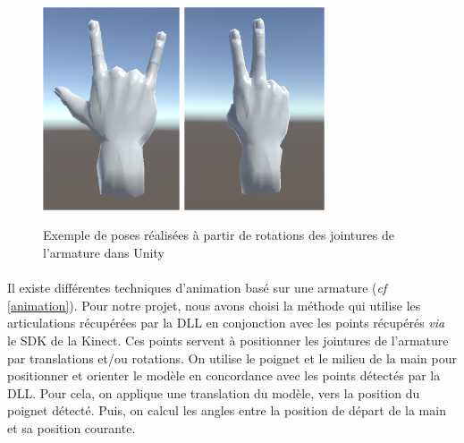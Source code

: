 \begin{figure}[!h]
	\centering
	\includegraphics[height=6cm]{images/HandPose1.png}
	\includegraphics[height=6cm]{images/HandPose2.png}
	\caption{Exemple de poses réalisées à partir de rotations des jointures de l'armature dans Unity}
	\label{fig:poseMain}
\end{figure}

\paragraph{} 
Il existe différentes techniques d'animation basé sur une armature (\textit{cf} \ref{animation}).
Pour notre projet, nous avons choisi la méthode qui utilise les articulations récupérées par la DLL en conjonction avec les points récupérés \textit{via} le SDK de la Kinect. Ces points servent à positionner les jointures de l'armature par translations et/ou rotations.
On utilise le poignet et le milieu de la main pour positionner et orienter le modèle en concordance avec les points détectés par la DLL.
Pour cela, on applique une translation du modèle, vers la position du poignet détecté. Puis, on calcul les angles entre la position de départ
de la main et sa position courante.

%
